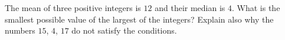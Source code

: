 The mean of three positive integers is $12$ and their median is $4$. What is the smallest possible value of the largest of the integers? Explain also why the numbers $15$, $4$, $17$ do not satisfy the conditions.
